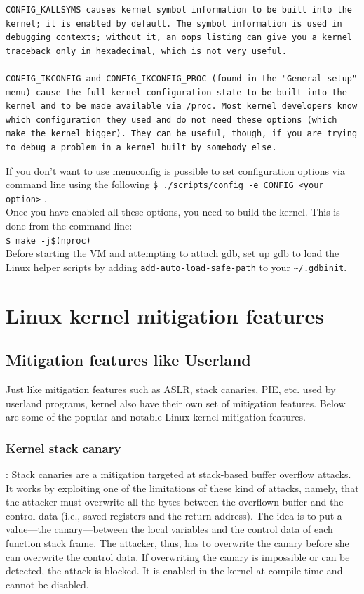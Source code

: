 \documentclass{masterthesis}
\newcommand{\glnote}[1]{\todo[color=blue!20]{#1}}
\begin{document}
\begin{lstlisting}
CONFIG_KALLSYMS causes kernel symbol information to be built into the kernel; it is enabled by default. The symbol information is used in debugging contexts; without it, an oops listing can give you a kernel traceback only in hexadecimal, which is not very useful.

CONFIG_IKCONFIG and CONFIG_IKCONFIG_PROC (found in the "General setup" menu) cause the full kernel configuration state to be built into the kernel and to be made available via /proc. Most kernel developers know which configuration they used and do not need these options (which make the kernel bigger). They can be useful, though, if you are trying to debug a problem in a kernel built by somebody else.
\end{lstlisting}

If you don’t want to use menuconfig is possible to set configuration options via command line using the following
\lstinline{$ ./scripts/config -e CONFIG_<your option>} .\\
Once you have enabled all these options, you need to build the kernel.
This is done from the command line:\\
\lstinline{$ make -j$(nproc)}\\
Before starting the VM and attempting to attach gdb, set up gdb to load the Linux helper scripts by adding \lstinline{add-auto-load-safe-path} to your \lstinline{~/.gdbinit}.

\chapter{Linux kernel mitigation features}
\label{ch:mitigation}
\section{Mitigation features like Userland}
\label{sect:like userland}
Just like mitigation features such as ASLR, stack canaries, PIE, etc. used by userland programs, kernel also have their own set of mitigation features. Below are some of the popular and notable Linux kernel mitigation features.

\subsection{Kernel stack canary}:
\label{subsect:canary}
\glnote{nel titolo usi cookie, ma poi parli di canary\ldots}
Stack canaries are a mitigation targeted at stack-based buffer overflow attacks. It works by exploiting one of the limitations of these kind of attacks, namely, that the attacker must overwrite all the bytes between the overflown buffer and the control data (i.e., saved registers and the return address). The idea is to put a value—the canary—between the local variables and the control data of each function stack frame. The attacker, thus, has to overwrite the canary before she can overwrite the control data. If overwriting the canary is impossible or can be detected, the attack is blocked.
It is enabled in the kernel at compile time and cannot be disabled.
\end{document}
